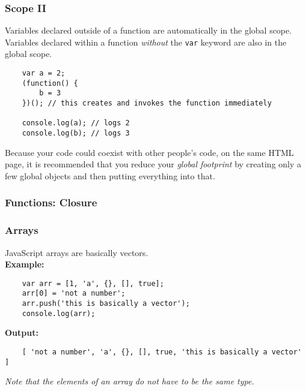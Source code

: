 \documentclass{lug}
\begin{document}
\begin{frame}[fragile]
    \frametitle{Scope II}

    Variables declared outside of a function are automatically in the global scope.\\

    Variables declared within a function \textit{without} the \texttt{var} keyword are also in the
    global scope.

    \begin{lstlisting}
    var a = 2;
    (function() {
        b = 3
    })(); // this creates and invokes the function immediately

    console.log(a); // logs 2
    console.log(b); // logs 3
    \end{lstlisting}

    Because your code could coexist with other people's code, on the same HTML page, it is
    recommended that you reduce your \textit{global footprint} by creating only a few global objects
    and then putting everything into that.
\end{frame}

\begin{frame}
    \frametitle{Functions: Closure}

\end{frame}

\begin{frame}[fragile]
    \frametitle{Arrays}

    JavaScript arrays are basically vectors.\\

    \textbf{Example:}

    \begin{lstlisting}
    var arr = [1, 'a', {}, [], true];
    arr[0] = 'not a number';
    arr.push('this is basically a vector');
    console.log(arr);
    \end{lstlisting}

    \textbf{Output:}

    \begin{lstlisting}
    [ 'not a number', 'a', {}, [], true, 'this is basically a vector' ]
    \end{lstlisting}

    \textit{Note that the elements of an array do not have to be the same type.}

\end{frame}
\end{document}
